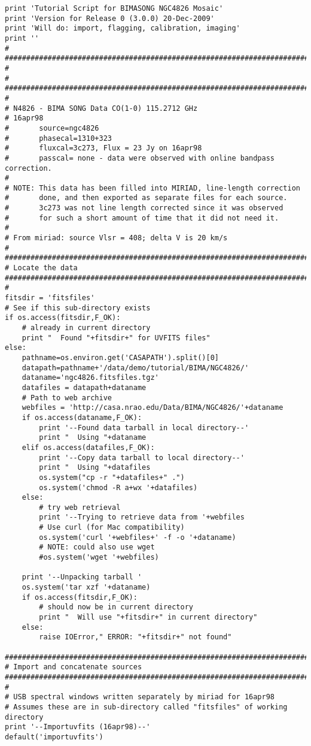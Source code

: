 \begin{verbatim}
print 'Tutorial Script for BIMASONG NGC4826 Mosaic'
print 'Version for Release 0 (3.0.0) 20-Dec-2009'
print 'Will do: import, flagging, calibration, imaging'
print ''
#
##########################################################################
#
# 
##########################################################################
#
# N4826 - BIMA SONG Data CO(1-0) 115.2712 GHz
# 16apr98
#       source=ngc4826
#       phasecal=1310+323
#       fluxcal=3c273, Flux = 23 Jy on 16apr98
#       passcal= none - data were observed with online bandpass correction.
#
# NOTE: This data has been filled into MIRIAD, line-length correction 
#       done, and then exported as separate files for each source.
#       3c273 was not line length corrected since it was observed
#       for such a short amount of time that it did not need it.  
#
# From miriad: source Vlsr = 408; delta V is 20 km/s 
#
##########################################################################
# Locate the data
##########################################################################
#
fitsdir = 'fitsfiles'
# See if this sub-directory exists
if os.access(fitsdir,F_OK):
    # already in current directory
    print "  Found "+fitsdir+" for UVFITS files"
else:
    pathname=os.environ.get('CASAPATH').split()[0]
    datapath=pathname+'/data/demo/tutorial/BIMA/NGC4826/'
    dataname='ngc4826.fitsfiles.tgz'
    datafiles = datapath+dataname
    # Path to web archive
    webfiles = 'http://casa.nrao.edu/Data/BIMA/NGC4826/'+dataname
    if os.access(dataname,F_OK):
        print '--Found data tarball in local directory--'
        print "  Using "+dataname
    elif os.access(datafiles,F_OK):
        print '--Copy data tarball to local directory--'
        print "  Using "+datafiles
        os.system("cp -r "+datafiles+" .")
        os.system('chmod -R a+wx '+datafiles)
    else:
        # try web retrieval
        print '--Trying to retrieve data from '+webfiles
        # Use curl (for Mac compatibility)
        os.system('curl '+webfiles+' -f -o '+dataname)
        # NOTE: could also use wget
        #os.system('wget '+webfiles)
        
    print '--Unpacking tarball '
    os.system('tar xzf '+dataname)
    if os.access(fitsdir,F_OK):
        # should now be in current directory
        print "  Will use "+fitsdir+" in current directory"
    else:
        raise IOError," ERROR: "+fitsdir+" not found"

##########################################################################
# Import and concatenate sources
##########################################################################
#
# USB spectral windows written separately by miriad for 16apr98
# Assumes these are in sub-directory called "fitsfiles" of working directory
print '--Importuvfits (16apr98)--'
default('importuvfits')


\end{verbatim}
